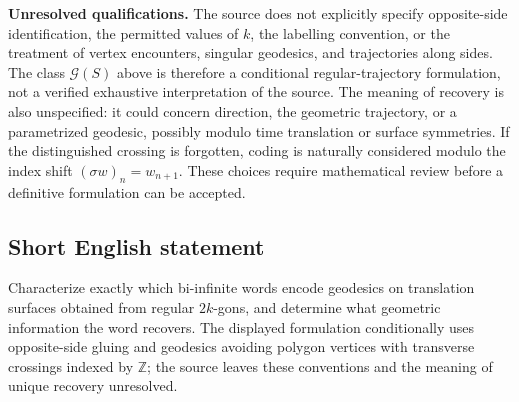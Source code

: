 \documentclass[11pt]{article}
\newcommand{\Z}{\mathbb{Z}}
\begin{document}
\textbf{Unresolved qualifications.} The source does not explicitly specify opposite-side identification, the permitted values of \(k\), the labelling convention, or the treatment of vertex encounters, singular geodesics, and trajectories along sides. The class \(\mathcal G(S)\) above is therefore a conditional regular-trajectory formulation, not a verified exhaustive interpretation of the source. The meaning of recovery is also unspecified: it could concern direction, the geometric trajectory, or a parametrized geodesic, possibly modulo time translation or surface symmetries. If the distinguished crossing is forgotten, coding is naturally considered modulo the index shift \((\sigma w)_n=w_{n+1}\). These choices require mathematical review before a definitive formulation can be accepted.
\subsection{Short English statement}
Characterize exactly which bi-infinite words encode geodesics on translation surfaces obtained from regular \(2k\)-gons, and determine what geometric information the word recovers. The displayed formulation conditionally uses opposite-side gluing and geodesics avoiding polygon vertices with transverse crossings indexed by \(\Z\); the source leaves these conventions and the meaning of unique recovery unresolved.
\end{document}
